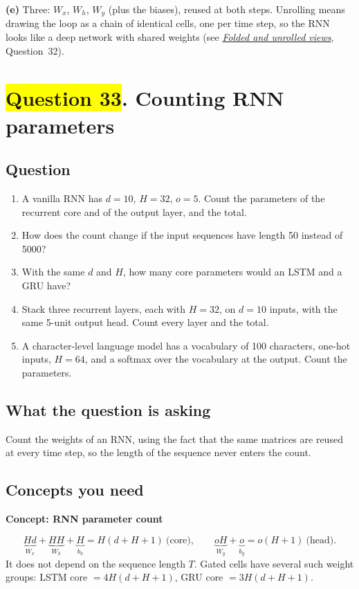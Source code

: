 \documentclass[12pt,a4paper]{article}
\newcommand{\concept}[2]{\par\medskip\phantomsection\label{#1}{\large\bfseries\color{blue!50!black} Concept: #2}\par}
\newcommand{\seeconcept}[3]{(see \hyperref[#1]{\textit{#2}}, Question~#3)}
\newcommand{\hlq}[1]{{\setlength{\fboxsep}{1.5pt}\colorbox{yellow}{#1}}}
\begin{document}
\textbf{(e)} Three: $W_x$, $W_h$, $W_y$ (plus the biases), reused at both steps. Unrolling means drawing the loop as a chain of identical cells, one per time step, so the RNN looks like a deep network with shared weights \seeconcept{c:unroll}{Folded and unrolled views}{32}.

\section[Question 33. Counting RNN parameters]{\hlq{Question 33}. Counting RNN parameters}
\subsection*{Question}
\begin{enumerate}[label=(\alph*)]
\item[\hlq{(a)}] A vanilla RNN has $d=10$, $H=32$, $o=5$. Count the parameters of the recurrent core and of the output layer, and the total.
\item[\hlq{(b)}] How does the count change if the input sequences have length 50 instead of 5000?
\item[\hlq{(c)}] With the same $d$ and $H$, how many core parameters would an LSTM and a GRU have?
\item[\hlq{(d)}] Stack three recurrent layers, each with $H=32$, on $d=10$ inputs, with the same 5-unit output head. Count every layer and the total.
\item[(e)] A character-level language model has a vocabulary of 100 characters, one-hot inputs, $H=64$, and a softmax over the vocabulary at the output. Count the parameters.
\end{enumerate}

\subsection*{What the question is asking}
Count the weights of an RNN, using the fact that the same matrices are reused at every time step, so the length of the sequence never enters the count.

\subsection*{Concepts you need}

\concept{c:rnnparams}{RNN parameter count}
\[
\underbrace{Hd}_{W_x}+\underbrace{HH}_{W_h}+\underbrace{H}_{b_h}=H(d+H+1)\ \text{(core)},\qquad \underbrace{oH}_{W_y}+\underbrace{o}_{b_y}=o(H+1)\ \text{(head)}.
\]
It does not depend on the sequence length $T$. Gated cells have several such weight groups: LSTM core $=4H(d+H+1)$, GRU core $=3H(d+H+1)$.
\end{document}
